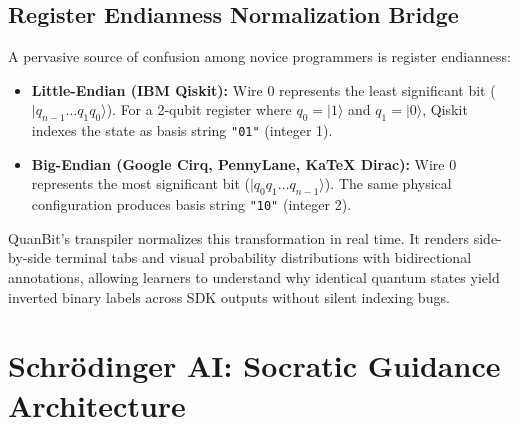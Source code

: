 \documentclass[11pt, a4paper]{article}
\begin{document}
\subsection{Register Endianness Normalization Bridge}
A pervasive source of confusion among novice programmers is register endianness:
\begin{itemize}
	\item \textbf{Little-Endian (IBM Qiskit):} Wire 0 represents the least significant bit ($|q_{n-1} \dots q_1 q_0\rangle$). For a 2-qubit register where $q_0 = |1\rangle$ and $q_1 = |0\rangle$, Qiskit indexes the state as basis string \texttt{"01"} (integer 1).
	\item \textbf{Big-Endian (Google Cirq, PennyLane, KaTeX Dirac):} Wire 0 represents the most significant bit ($|q_0 q_1 \dots q_{n-1}\rangle$). The same physical configuration produces basis string \texttt{"10"} (integer 2).
\end{itemize}
QuanBit's transpiler normalizes this transformation in real time. It renders side-by-side terminal tabs and visual probability distributions with bidirectional annotations, allowing learners to understand why identical quantum states yield inverted binary labels across SDK outputs without silent indexing bugs.

\newpage

\section{Schr{\"o}dinger AI: Socratic Guidance Architecture}
\end{document}
